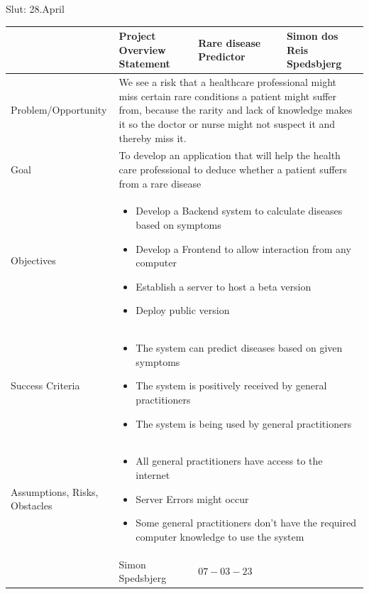 Slut: 28.April
\begin{center}
	\begin{tabular}[h]{|p{7em}|p{5em}|p{5em}|p{5em}|p{5em}|}
		\hline
		& {\scriptsize Project Overview Statement} & {\scriptsize Rare disease Predictor} & & {\scriptsize Simon dos Reis Spedsbjerg} \\ \hline
		{\scriptsize Problem/Opportunity} & \multicolumn{4}{|p{20em}|}{\scriptsize We see a risk that a healthcare professional might miss certain rare conditions a patient might suffer from, because the rarity and lack of knowledge makes it so the doctor or nurse might not suspect it and thereby miss it.}\\ \hline
		{\scriptsize Goal} & \multicolumn{4}{|p{20em}|}{\scriptsize To develop an application that will help the health care professional to deduce whether a patient suffers from a rare disease}\\ \hline
		{\scriptsize Objectives} & \multicolumn{4}{|p{20em}|}{\scriptsize \begin{itemize}
		\item Develop a Backend system to calculate diseases based on symptoms
		\item Develop a Frontend to allow interaction from any computer
		\item Establish a server to host a beta version
		\item Deploy public version
			 \end{itemize}
		 } \\ \hline
	 {\scriptsize Success Criteria} & \multicolumn{4}{|p{20em}|}{\scriptsize\begin{itemize}
	 	\item The system can predict diseases based on given symptoms
	 	\item The system is positively received by general practitioners
	 	\item The system is being used by general practitioners
	 \end{itemize}} \\ \hline
 	{\scriptsize Assumptions, Risks, Obstacles} & \multicolumn{4}{|p{20em}|}{\scriptsize
 	\begin{itemize}
 		\item All general practitioners have access to the internet
 		\item Server Errors might occur
 		\item Some general practitioners don't have the required computer knowledge to use the system
 	\end{itemize}	
 }\\ \hline
& {\scriptsize Simon Spedsbjerg} & {\scriptsize $07-03-23$} & & \\ \hline
	\end{tabular}
\end{center}

